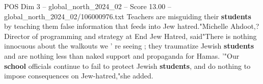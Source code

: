 \begin{textsample}{POS Dim 3 – global\_north\_2024\_02 – Score 13.00 – global\_north\_2024\_02/106000976.txt}
Teachers are misguiding their \textbf{students} by teaching them false information that feeds into Jew hatred."Michelle Ahdoot,?
Director of programming and strategy at End Jew Hatred, said"There is nothing innocuous about the walkouts we ' re seeing ; they traumatize Jewish \textbf{students} and are nothing less than naked support and propaganda for Hamas. '"Our \textbf{school} officials continue to fail to protect Jewish \textbf{students}, and do nothing to impose consequences on Jew-hatred,"she added.

\end{textsample}
